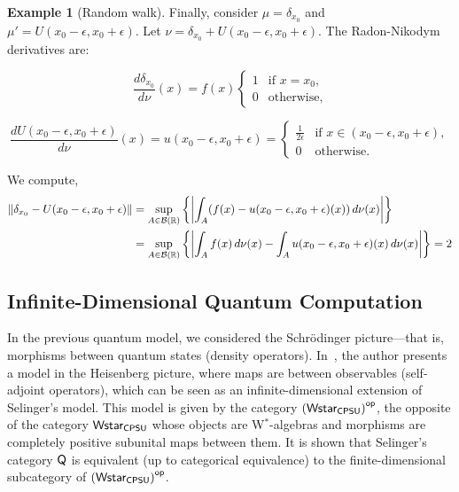 \documentclass[10pt,a4paper]{amsart}
\theoremstyle{definition}
\theoremstyle{definition}
\newtheorem{example}[definition]{Example}
\theoremstyle{definition}
\theoremstyle{definition}
\theoremstyle{definition}
\theoremstyle{definition}
\begin{document}
\begin{example}[Random walk]
\begin{comment}
\end{comment}

Finally, consider $\mu = \delta_{x_0} $  and $\mu' =  U(x_0 - \epsilon, x_0 + \epsilon) $. Let \(\nu = \delta_{x_0} + U(x_0 - \epsilon, x_0 + \epsilon) \). The Radon-Nikodym derivatives are:

\[
\frac{d\delta_{x_0}}{d\nu}(x) = f (x)
\begin{cases} 
1 & \text{if } x = x_0, \\
0 & \text{otherwise},
\end{cases}
\]

\[
\frac{dU(x_0 - \epsilon, x_0 + \epsilon)}{d\nu}(x) = u(x_0 - \epsilon, x_0 + \epsilon) = 
\begin{cases} 
\frac{1}{2\epsilon} & \text{if } x \in (x_0 - \epsilon, x_0 + \epsilon), \\
0 & \text{otherwise}.
\end{cases}
\]

We compute,
\begin{align*}
  \left\lVert \delta_{x_0}-U(x_0 - \epsilon, x_0 + \epsilon) \right\rVert &= \sup_{A \in \mathcal{B}(\mathbb{R})} \left\{ \left\vert \int_A (f(x)- u(x_0 - \epsilon, x_0 + \epsilon) (x))\, d\nu(x) \right\vert \right\} \\
  &= \sup_{A \in \mathcal{B}(\mathbb{R})} \left\{ \left\vert \int_A f(x)\, d\nu(x) -  \int_A   u(x_0 - \epsilon, x_0 + \epsilon) (x) \, d\nu(x) \right\vert \right\} = 2
\end{align*}
    


\subsection{Infinite-Dimensional Quantum Computation}

In the previous quantum model, we considered the Schr\"odinger picture---that is, morphisms between quantum states (\ie density operators). In~\cite{choSemanticsQuantumProgramming2016}, the author presents a model in the Heisenberg picture, where maps are between observables (\ie self-adjoint operators), which can be seen as an infinite-dimensional extension of Selinger’s model. This model is given by the category $\left(\mathsf{Wstar_{CPSU}}\right)^{\mathsf{op}}$, the opposite of the category $\mathsf{Wstar_{CPSU}}$ whose objects are W$^*$-algebras and morphisms are completely positive subunital maps between them. It is shown that Selinger’s category $\mathsf{Q}$ is equivalent (up to categorical equivalence) to the finite-dimensional subcategory of $\left(\mathsf{Wstar_{CPSU}}\right)^{\mathsf{op}}$.


\end{example}
\end{document}
